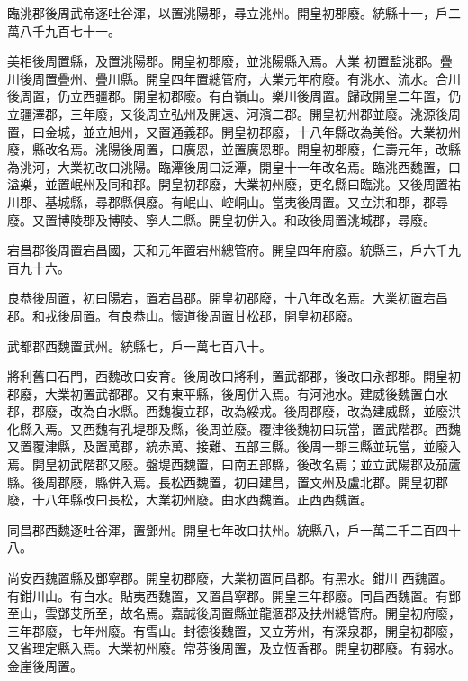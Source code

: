 \begin{pinyinscope}
 臨洮郡後周武帝逐吐谷渾，以置洮陽郡，尋立洮州。開皇初郡廢。統縣十一，戶二萬八千九百七十一。



 美相後周置縣，及置洮陽郡。開皇初郡廢，並洮陽縣入焉。大業
 初置監洮郡。疊川後周置疊州、疊川縣。開皇四年置總管府，大業元年府廢。有洮水、流水。合川後周置，仍立西疆郡。開皇初郡廢。有白嶺山。樂川後周置。歸政開皇二年置，仍立疆澤郡，三年廢，又後周立弘州及開遠、河濱二郡。開皇初州郡並廢。洮源後周置，曰金城，並立旭州，又置通義郡。開皇初郡廢，十八年縣改為美俗。大業初州廢，縣改名焉。洮陽後周置，曰廣恩，並置廣恩郡。開皇初郡廢，仁壽元年，改縣為洮河，大業初改曰洮陽。臨潭後周曰泛潭，開皇十一年改名焉。臨洮西魏置，曰溢樂，並置岷州及同和郡。開皇初郡廢，大業初州廢，更名縣曰臨洮。又後周置祐川郡、基城縣，尋郡縣俱廢。有岷山、崆峒山。當夷後周置。又立洪和郡，郡尋廢。又置博陵郡及博陵、寧人二縣。開皇初併入。和政後周置洮城郡，尋廢。



 宕昌郡後周置宕昌國，天和元年置宕州總管府。開皇四年府廢。統縣三，戶六千九百九十六。



 良恭後周置，初曰陽宕，置宕昌郡。開皇初郡廢，十八年改名焉。大業初置宕昌
 郡。和戎後周置。有良恭山。懷道後周置甘松郡，開皇初郡廢。



 武都郡西魏置武州。統縣七，戶一萬七百八十。



 將利舊曰石門，西魏改曰安育。後周改曰將利，置武都郡，後改曰永都郡。開皇初郡廢，大業初置武都郡。又有東平縣，後周併入焉。有河池水。建威後魏置白水郡，郡廢，改為白水縣。西魏複立郡，改為綏戎。後周郡廢，改為建威縣，並廢洪化縣入焉。又西魏有孔堤郡及縣，後周並廢。覆津後魏初曰玩當，置武階郡。西魏又置覆津縣，及置萬郡，統赤萬、接難、五部三縣。後周一郡三縣並玩當，並廢入焉。開皇初武階郡又廢。盤堤西魏置，曰南五部縣，後改名焉；並立武陽郡及茄蘆縣。後周郡廢，縣併入焉。長松西魏置，初曰建昌，置文州及盧北郡。開皇初郡廢，十八年縣改曰長松，大業初州廢。曲水西魏置。正西西魏置。



 同昌郡西魏逐吐谷渾，置鄧州。開皇七年改曰扶州。統縣八，戶一萬二千二百四十八。



 尚安西魏置縣及鄧寧郡。開皇初郡廢，大業初置同昌郡。有黑水。鉗川
 西魏置。有鉗川山。有白水。貼夷西魏置，又置昌寧郡。開皇三年郡廢。同昌西魏置。有鄧至山，雲鄧艾所至，故名焉。嘉誠後周置縣並龍涸郡及扶州總管府。開皇初府廢，三年郡廢，七年州廢。有雪山。封德後魏置，又立芳州，有深泉郡，開皇初郡廢，又省理定縣入焉。大業初州廢。常芬後周置，及立恆香郡。開皇初郡廢。有弱水。金崖後周置。




\end{pinyinscope}
